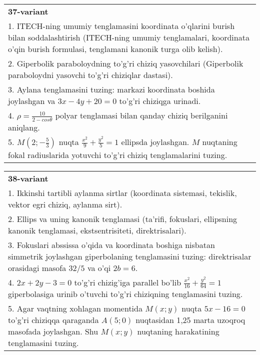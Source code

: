 \documentclass{article}
\begin{document}
\begin{tabular}{m{17cm}}
\textbf{37-variant}\\
1. ITECH-ning umumiy tenglamasini koordinata o'qlarini burish bilan soddalashtirish (ITECH-ning umumiy tenglamalari, koordinata o'qin burish formulasi, tenglamani kanonik turga olib kelish).\\

2. Giperbolik paraboloydning to'g'ri chiziq yasovchilari (Giperbolik paraboloydni yasovchi to'g'ri chiziqlar dastasi).\\

3. Aylana tenglamasini tuzing: markazi koordinata boshida joylashgan va $3x-4y+20=0$ to'g'ri chiziqga urinadi.\\

4. $\rho = \frac{10}{2 - cos\theta}$ polyar tenglamasi bilan qanday chiziq berilganini aniqlang.  \\

5. $M(2; - \frac{5}{3})$ nuqta $\frac{x^{2}}{9} + \frac{y^{2}}{5} = 1$ ellipsda joylashgan. $M$ nuqtaning fokal radiuslarida yotuvchi to'g'ri chiziq tenglamalarini tuzing.  
\end{tabular}
\vspace{1cm}


\begin{tabular}{m{17cm}}
\textbf{38-variant}\\
1. Ikkinshi tartibli aylanma sirtlar (koordinata sistemasi, tekislik, vektor egri chiziq, aylanma sirt).\\

2. Ellips va uning kanonik tenglamasi (ta'rifi, fokuslari, ellipsning kanonik tenglamasi, ekstsentrisiteti, direktrisalari).\\

3. Fokuslari abssissa o'qida va koordinata boshiga nisbatan simmetrik joylashgan giperbolaning tenglamasini tuzing: direktrisalar orasidagi masofa $32/5$ va o'qi $2b=6$.\\

4. $2x + 2y - 3 = 0$ to'g'ri chizig'iga parallel bo'lib $\frac{x^{2}}{16} + \frac{y^{2}}{64} = 1$ giperbolasiga urinib o'tuvchi to'g'ri chiziqning tenglamasini tuzing.  \\

5. Agar vaqtning xohlagan momentida $M(x;y)$ nuqta $5x - 16 = 0$ to'g'ri chiziqqa qaraganda $A(5;0)$ nuqtasidan 1,25 marta uzoqroq masofada joylashgan. Shu $M(x;y)$ nuqtaning harakatining tenglamasini tuzing.  
\end{tabular}
\vspace{1cm}
\end{document}
